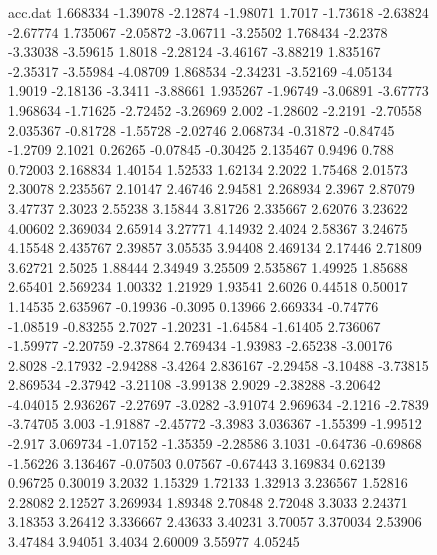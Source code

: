 \begin{figure}[H]
\begin{filecontents}{acc.dat}
                1.668334	-1.39078	-2.12874	-1.98071
                1.7017	-1.73618	-2.63824	-2.67774
                1.735067	-2.05872	-3.06711	-3.25502
                1.768434	-2.2378	-3.33038	-3.59615
                1.8018	-2.28124	-3.46167	-3.88219
                1.835167	-2.35317	-3.55984	-4.08709
                1.868534	-2.34231	-3.52169	-4.05134
                1.9019	-2.18136	-3.3411	-3.88661
                1.935267	-1.96749	-3.06891	-3.67773
                1.968634	-1.71625	-2.72452	-3.26969
                2.002	-1.28602	-2.2191	-2.70558
                2.035367	-0.81728	-1.55728	-2.02746
                2.068734	-0.31872	-0.84745	-1.2709
                2.1021	0.26265	-0.07845	-0.30425
                2.135467	0.9496	0.788	0.72003
                2.168834	1.40154	1.52533	1.62134
                2.2022	1.75468	2.01573	2.30078
                2.235567	2.10147	2.46746	2.94581
                2.268934	2.3967	2.87079	3.47737
                2.3023	2.55238	3.15844	3.81726
                2.335667	2.62076	3.23622	4.00602
                2.369034	2.65914	3.27771	4.14932
                2.4024	2.58367	3.24675	4.15548
                2.435767	2.39857	3.05535	3.94408
                2.469134	2.17446	2.71809	3.62721
                2.5025	1.88444	2.34949	3.25509
                2.535867	1.49925	1.85688	2.65401
                2.569234	1.00332	1.21929	1.93541
                2.6026	0.44518	0.50017	1.14535
                2.635967	-0.19936	-0.3095	0.13966
                2.669334	-0.74776	-1.08519	-0.83255
                2.7027	-1.20231	-1.64584	-1.61405
                2.736067	-1.59977	-2.20759	-2.37864
                2.769434	-1.93983	-2.65238	-3.00176
                2.8028	-2.17932	-2.94288	-3.4264
                2.836167	-2.29458	-3.10488	-3.73815
                2.869534	-2.37942	-3.21108	-3.99138
                2.9029	-2.38288	-3.20642	-4.04015
                2.936267	-2.27697	-3.0282	-3.91074
                2.969634	-2.1216	-2.7839	-3.74705
                3.003	-1.91887	-2.45772	-3.3983
                3.036367	-1.55399	-1.99512	-2.917
                3.069734	-1.07152	-1.35359	-2.28586
                3.1031	-0.64736	-0.69868	-1.56226
                3.136467	-0.07503	0.07567	-0.67443
                3.169834	0.62139	0.96725	0.30019
                3.2032	1.15329	1.72133	1.32913
                3.236567	1.52816	2.28082	2.12527
                3.269934	1.89348	2.70848	2.72048
                3.3033	2.24371	3.18353	3.26412
                3.336667	2.43633	3.40231	3.70057
                3.370034	2.53906	3.47484	3.94051
                3.4034	2.60009	3.55977	4.05245

\end{filecontents}
\end{figure}
